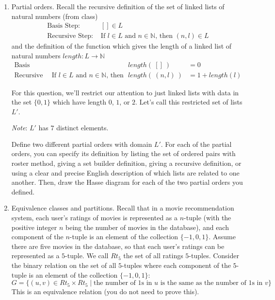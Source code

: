 \begin{enumerate}[labelindent=0pt, leftmargin=0pt]
    \item\gradeCorrect Partial orders. Recall the recursive definition of the set of linked lists of 
    natural numbers (from class)
    \[
    \begin{array}{ll}
        \textrm{Basis Step: } & [] \in L \\
        \textrm{Recursive Step: } & \textrm{If } l \in L\textrm{ and }n \in \mathbb{N} \textrm{, then } (n, l) \in L
    \end{array}
    \]
    and the definition of the function which gives the length of a linked list of natural numbers 
    $length: L \to \mathbb{N}$
        \[
        \begin{array}{llll}
            \textrm{Basis Step:} &  & length(~[]~) &= 0 \\
            \textrm{Recursive Step:} & \textrm{If } l \in L\textrm{ and }n \in \mathbb{N}\textrm{, then  } & length(~(n, l)~)  &= 1+ length(l)
        \end{array}
         \]
     
    For this question, we'll restrict our attention to just linked lists with data in the set $\{0,1\}$
    which have length $0$, $1$, or $2$. Let's call this restricted set of lists $L'$.
    
    {\it Note}: $L'$ has $7$ distinct elements.

    Define two different partial orders with domain $L'$. For each of the partial orders, you  can specify its definition by
    listing the set of ordered pairs with roster method, giving a set builder
    definition, giving a recursive definition, or using a clear and precise English description of which lists are related to one another.
    Then, draw the Hasse diagram for each of the two partial orders you defined.


    \item Equivalence classes and partitions. 
    Recall that 
    in a movie recommendation system, each 
    user's ratings of movies is represented as a $n$-tuple (with the positive integer $n$ 
    being the number of movies in the database), and each component of 
    the $n$-tuple is an element of the collection $\{-1,0,1\}$. Assume there are five movies in the database, 
    so that each user's ratings
    can be represented as a $5$-tuple. We call $Rt_5$ the set of all ratings $5$-tuples.
    Consider the binary relation on the  set of all 
    $5$-tuples where each  component of the $5$-tuple is an element of the collection $\{-1,0,1\}$:
    \[
        G = \{ (u,v) \in Rt_5 \times Rt_5 \mid \text{the number of $1$s in $u$ is the same as the number of $1$s in $v$} \}
    \]
    This is an equivalence relation (you do not need to prove this).


\end{enumerate}
